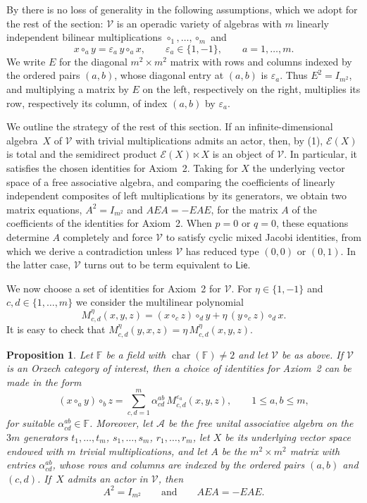 \documentclass[reqno,a4paper]{amsart}
\theoremstyle{plain}
\newtheorem{proposition}[subsection]{Proposition}
\theoremstyle{definition}
\theoremstyle{remark}
\numberwithin{equation}{section}
\newcommand{\F}{\mathbb{F}}
\newcommand{\E}{\mathcal{E}}
\newcommand{\V}{\mathcal{V}}
\DeclareMathOperator{\bchar}{char}
\newcommand{\Lie}{\ensuremath{\mathsf{Lie}}}
\begin{document}
By  there is no loss of generality in the following assumptions, which we adopt for the rest of the section: $\V$ is an operadic variety of algebras with $m$ linearly independent bilinear multiplications $\circ_1,\ldots,\circ_m$ and
\[
x\circ_ay=\varepsilon_a\,y\circ_ax,
\qquad
\varepsilon_a\in\{1,-1\}, \qquad
a=1,\ldots,m.
\]
We write $E$ for the diagonal $m^2 \times m^2$ matrix with rows and columns indexed by the ordered pairs $(a,b)$, whose diagonal entry at $(a,b)$ is $\varepsilon_a$. Thus $E^2=I_{m^2}$, and multiplying a matrix by $E$ on the left, respectively on the right, multiplies its row, respectively its column, of index $(a,b)$ by $\varepsilon_a$.

We outline the strategy of the rest of this section. If an infinite-dimensional algebra~$X$ of $\V$ with trivial multiplications admits an actor, then, by (1), $\E(X)$ is total and the semidirect product $\E(X)\ltimes X$ is an object of $\V$. In particular, it satisfies the chosen identities for Axiom~2. Taking for $X$ the underlying vector space of a free associative algebra, and comparing the coefficients of linearly independent composites of left multiplications by its generators, we obtain two matrix equations, $A^2=I_{m^2}$ and $AEA=-EAE$, for the matrix $A$ of the coefficients of the identities for Axiom~2. When $p=0$ or $q=0$, these equations determine $A$ completely and force $\V$ to satisfy cyclic mixed Jacobi identities, from which we derive a contradiction unless $\V$ has reduced type $(0,0)$ or $(0,1)$. In the latter case, $\V$ turns out to be term equivalent to $\Lie$.

We now choose a set of identities for Axiom~2 for $\V$. For $\eta\in\{1,-1\}$ and $c,d\in\{1,\ldots,m\}$ we consider the multilinear polynomial
\[
M^{\eta}_{c,d}(x,y,z)=(x\circ_cz)\circ_dy+\eta\,(y\circ_cz)\circ_dx.
\]
It is easy to check that $M^{\eta}_{c,d}(y,x,z)=\eta\,M^{\eta}_{c,d}(x,y,z)$.

\begin{proposition}\label{TheoremIndependentLieBracketsNotAR2}
Let $\F$ be a field with $\bchar(\F)\neq2$ and let $\V$ be as above. If $\V$ is an Orzech category of interest, then a choice of identities for Axiom~2 can be made in the form
\begin{equation}\label{EqMixedAxiomLieN2}
(x\circ_ay)\circ_bz
=
\sum_{c,d=1}^{m}\alpha^{ab}_{cd}\,M^{\varepsilon_a}_{c,d}(x,y,z),
\qquad
1\leq a,b\leq m,
\end{equation}
for suitable $\alpha^{ab}_{cd}\in\F$. Moreover, let $\mathcal A$ be the free unital associative algebra on the $3m$ generators $t_1,\ldots,t_m$, $s_1,\ldots,s_m$, $r_1,\ldots,r_m$, let $X$ be its underlying vector space endowed with $m$ trivial multiplications, and let $A$ be the $m^2 \times m^2$ matrix with entries $\alpha^{ab}_{cd}$, whose rows and columns are indexed by the ordered pairs $(a,b)$ and $(c,d)$. If~$X$ admits an actor in $\V$, then
\begin{equation}\label{EqForcedCoefficients}
A^2=I_{m^2}
\qquad\text{and}\qquad
AEA=-EAE .
\end{equation}
\end{proposition}
\end{document}

